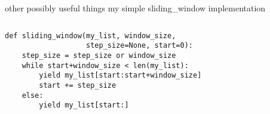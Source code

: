\documentclass{beamer}
\begin{document}
\begin{frame}[fragile]{other possibly useful things}
    {my simple sliding\_window implementation}
    \begin{columns}

        \begin{lstlisting}[basicstyle=\scriptsize,numbers=none]
def sliding_window(my_list, window_size,
                   step_size=None, start=0):
    step_size = step_size or window_size
    while start+window_size < len(my_list):
        yield my_list[start:start+window_size]
        start += step_size
    else:
        yield my_list[start:]
        \end{lstlisting}
    \end{columns}
\end{frame}
\end{document}
